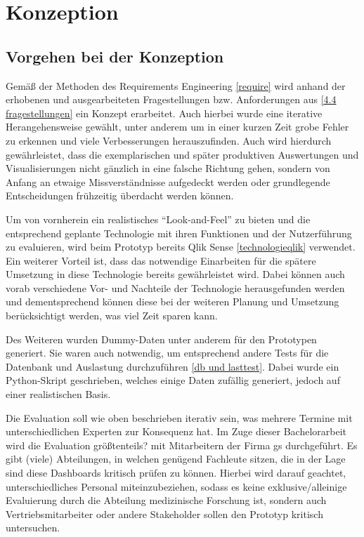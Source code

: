 \chapter{Konzeption}
\label{konzept}

\minitoc\pagebreak

\section{Vorgehen bei der Konzeption}


Gemäß der Methoden des Requirements Engineering \ref{require} wird anhand der erhobenen und ausgearbeiteten Fragestellungen bzw. Anforderungen aus \ref{4.4 fragestellungen} ein Konzept erarbeitet. 
Auch hierbei wurde eine iterative Herangehensweise gewählt, unter anderem um in einer kurzen Zeit grobe Fehler zu erkennen und viele Verbesserungen herauszufinden. 
Auch wird hierdurch gewährleistet, dass die exemplarischen und später produktiven Auswertungen und Visualisierungen nicht gänzlich in eine falsche Richtung gehen, sondern von Anfang an etwaige Missverständnisse aufgedeckt werden oder grundlegende Entscheidungen frühzeitig überdacht werden können.

Um von vornherein ein realistisches "`Look-and-Feel"' zu bieten und die entsprechend geplante Technologie mit ihren Funktionen und der Nutzerführung zu evaluieren, wird beim Prototyp bereits Qlik Sense \ref{technologieqlik} verwendet. 
Ein weiterer Vorteil ist, dass das notwendige Einarbeiten für die spätere Umsetzung in diese Technologie bereits gewährleistet wird. 
Dabei können auch vorab verschiedene Vor- und Nachteile der Technologie herausgefunden werden und dementsprechend können diese bei der weiteren Planung und Umsetzung berücksichtigt werden, was viel Zeit sparen kann.

Des Weiteren wurden Dummy-Daten unter anderem für den Prototypen generiert. 
Sie waren auch notwendig, um entsprechend andere Tests für die Datenbank und Auslastung durchzuführen \ref{db und lasttest}. 
Dabei wurde ein Python-Skript geschrieben, welches einige Daten zufällig generiert, jedoch auf einer realistischen Basis.

Die Evaluation soll wie oben beschrieben iterativ sein, was mehrere Termine mit unterschiedlichen Experten zur Konsequenz hat. 
Im Zuge dieser Bachelorarbeit wird die Evaluation größtenteils? mit Mitarbeitern der Firma \gls{gs} durchgeführt. 
Es gibt (viele) Abteilungen, in welchen genügend Fachleute sitzen, die in der Lage sind diese Dashboards kritisch prüfen zu können. 
Hierbei wird darauf geachtet, unterschiedliches Personal miteinzubeziehen, sodass es keine exklusive/alleinige Evaluierung durch die Abteilung medizinische Forschung ist, sondern auch Vertriebsmitarbeiter oder andere Stakeholder sollen den Prototyp kritisch untersuchen.

